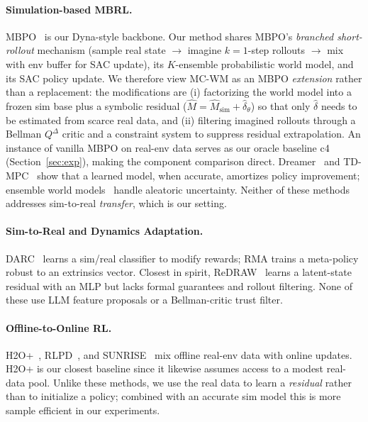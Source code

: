 \documentclass{article}
\theoremstyle{definition}
\newcommand{\QD}{Q^{\Delta}}
\begin{document}
\paragraph{Simulation-based MBRL.}
MBPO~\cite{mbpo2019} is our Dyna-style backbone.  Our method shares
MBPO's \emph{branched short-rollout} mechanism (sample real state $\to$
imagine $k{=}1$-step rollouts $\to$ mix with env buffer for SAC update),
its $K$-ensemble probabilistic world model, and its SAC policy update.
We therefore view MC-WM as an MBPO \emph{extension} rather than a
replacement: the modifications are (i) factorizing the world model into
a frozen sim base plus a symbolic residual
($\hat M = \hat M_{\mathrm{sim}} + \hat\delta_\theta$) so that only
$\hat\delta$ needs to be estimated from scarce real data, and (ii)
filtering imagined rollouts through a Bellman $\QD$ critic and a
constraint system to suppress residual extrapolation.  An instance of
vanilla MBPO on real-env data serves as our oracle baseline c4
(Section~\ref{sec:exp}), making the component comparison direct.
Dreamer~\cite{dreamer2020} and TD-MPC~\cite{tdmpc2022} show that a
learned model, when accurate, amortizes policy improvement; ensemble
world models~\cite{chua2018pets} handle aleatoric uncertainty.  Neither
of these methods addresses sim-to-real \emph{transfer}, which is our
setting.

\paragraph{Sim-to-Real and Dynamics Adaptation.}
DARC~\cite{darc2020} learns a sim/real classifier to modify rewards; RMA
\cite{rma2021} trains a meta-policy robust to an extrinsics vector.
Closest in spirit, ReDRAW~\cite{redraw2024} learns a latent-state residual
with an MLP but lacks formal guarantees and rollout filtering.  None of
these use LLM feature proposals or a Bellman-critic trust filter.

\paragraph{Offline-to-Online RL.}
H2O+~\cite{h2oplus}, RLPD~\cite{rlpd2023}, and SUNRISE~\cite{sunrise2021}
mix offline real-env data with online updates.  H2O+ is our closest
baseline since it likewise assumes access to a modest real-data pool.
Unlike these methods, we use the real data to learn a \emph{residual}
rather than to initialize a policy; combined with an accurate sim model
this is more sample efficient in our experiments.
\end{document}
